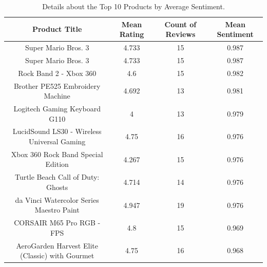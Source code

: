 \begin{table}[h]
  \centering
  \begin{tabular}{cccc}
      \hline
      \textbf{Product Title} & \textbf{Mean Rating} & \textbf{Count of Reviews} & \textbf{Mean Sentiment} \\
      \hline
      Super Mario Bros. 3                             &         4.733 &      15 &        0.987 \\
      Super Mario Bros. 3                             &         4.733 &      15 &        0.987 \\
      Rock Band 2 - Xbox 360                          &         4.6   &      15 &        0.982 \\
      Brother PE525 Embroidery Machine                &         4.692 &      13 &        0.981 \\
      Logitech Gaming Keyboard G110                   &         4     &      13 &        0.979 \\
      LucidSound LS30 - Wireless Universal Gaming     &         4.75  &      16 &        0.976 \\
      Xbox 360 Rock Band Special Edition              &         4.267 &      15 &        0.976 \\
      Turtle Beach Call of Duty: Ghosts               &         4.714 &      14 &        0.976 \\
      da Vinci Watercolor Series Maestro Paint        &         4.947 &      19 &        0.976 \\
      CORSAIR M65 Pro RGB - FPS                       &         4.8   &      15 &        0.969 \\
      AeroGarden Harvest Elite (Classic) with Gourmet &         4.75  &      16 &        0.968 \\
           \hline
  \end{tabular}
  \caption{Details about the Top 10 Products by Average Sentiment.}
  \label{tab:top 10 products statistics}
\end{table}


